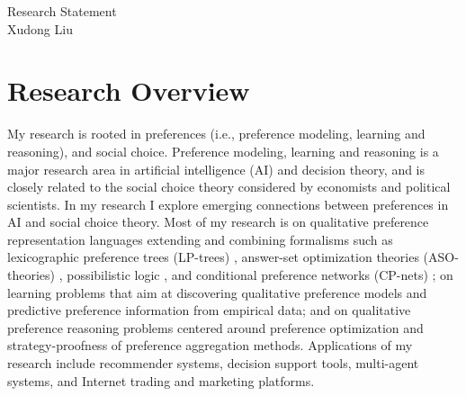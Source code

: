 \documentclass[11pt]{article}
\begin{document}
%

\begingroup  
  \centering
  \huge Research Statement\\[0.25em]
  \large Xudong Liu\par
\endgroup


\section{Research Overview}
\noindent My research is rooted in preferences (i.e., 
preference modeling, learning and reasoning),
and social choice.
Preference modeling, learning and reasoning is a major research 
area in artificial intelligence (AI) and decision theory, and is closely related to the 
social choice theory considered by economists and political scientists. In my research I 
explore emerging connections between preferences in AI and social choice theory. 
Most of my research is on qualitative preference representation languages extending and combining
formalisms such as  
lexicographic preference trees (LP-trees) \cite{booth:learningLP}, 
answer-set optimization theories (ASO-theories) \cite{Brewka:ASO}, 
possibilistic logic \cite{dubois1991towards}, and 
conditional preference networks (CP-nets) \cite{boutilier2004cp};
on learning problems that aim at discovering qualitative preference 
models and predictive preference information from empirical data; and on
qualitative preference reasoning problems centered around preference optimization 
and strategy-proofness of preference aggregation methods.
Applications of my research include recommender systems, decision support tools,
multi-agent systems, and Internet trading and marketing platforms.
\end{document}
